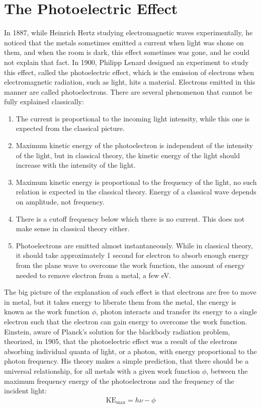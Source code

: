 \documentclass[11pt]{article}
\theoremstyle{break}
\theoremstyle{break}
\begin{document}
\section{The Photoelectric Effect}
In 1887, while Heinrich Hertz studying electromagnetic waves experimentally, he noticed that the metals sometimes emitted a current when light was shone on them, and when the room is dark, this effect sometimes was gone, and he could not explain that fact. In 1900, Philipp Lenard designed an experiment to study this effect, called the photoelectric effect, which is the emission of electrons when electromagnetic radiation, such as light, hits a material. Electrons emitted in this manner are called photoelectrons. There are several phenomenon that cannot be fully explained classically:
\begin{enumerate}
\item The current is proportional to the incoming light intensity, while this one is expected from the classical picture.
\item Maximum kinetic energy of the photoelectron is independent of the intensity of the light, but in classical theory, the kinetic energy of the light should increase with the intensity of the light. 
\item Maximum kinetic energy is proportional to the frequency of the light, no such relation is expected in the classical theory. Energy of a classical wave depends on amplitude, not frequency. 
\item There is a cutoff frequency below which there is no current. This does not make sense in classical theory either.
\item Photoelectrons are emitted almost instantaneously. While in classical theory, it should take approximately 1 second for electron to absorb enough energy from the plane wave to overcome the work function, the amount of energy needed to remove electron from a metal, a few eV.
\end{enumerate}
The big picture of the explanation of  such effect is that electrons are free to move in metal, but it takes energy to liberate them from the metal, the energy is known as the work function $\phi$, photon interacts and transfer its energy to a single electron such that the electron can gain energy to overcome the work function. Einstein, aware of Planck's solution for the blackbody radiation problem, theorized, in 1905, that the photoelectric effect was a result of the electrons absorbing individual quanta of light, or a photon, with energy proportional to the photon frequency. His theory makes a simple prediction, that there should be a universal relationship, for all metals with a given work function $\phi$, between the maximum frequency energy of the photoelectrons and the frequency of the incident light:
\begin{align}
\text{KE}_{\text{max}} = h \nu - \phi
\end{align}
\end{document}

